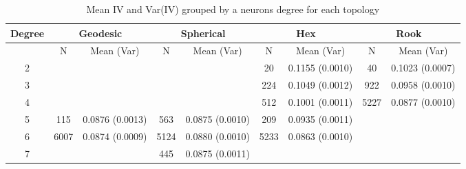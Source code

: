 \begin{table}[hbt]
\centering
\caption{Mean IV and Var(IV) grouped by a neurons degree for each topology}
\label{meanvar1}
\begin{tabular}{|c||c|c||c|c||c|c||c|c|}
\hline
\textbf{Degree} & \multicolumn{2}{c||}{\textbf{Geodesic}} &
\multicolumn{2}{c||}{\textbf{Spherical}} & \multicolumn{2}{c||}{\textbf{Hex}} &
\multicolumn{2}{c|}{\textbf{Rook}} \\
\hline
& N & Mean (Var) & N & Mean (Var) & N & Mean (Var) & N & Mean (Var) \\

\hline
2&&&&& 20& 0.1155 (0.0010)& 40& 0.1023 (0.0007)\\ 
3&&&&& 224& 0.1049 (0.0012)& 922& 0.0958 (0.0010)\\ 
4&&&&& 512& 0.1001 (0.0011)& 5227& 0.0877 (0.0010)\\ 
5& 115& 0.0876 (0.0013)& 563& 0.0875 (0.0010)& 209& 0.0935 (0.0011)&&\\ 
6& 6007& 0.0874 (0.0009)& 5124& 0.0880 (0.0010)& 5233& 0.0863 (0.0010)&&\\ 
7&&& 445& 0.0875 (0.0011)&&&&\\ 
\hline
\end{tabular} \end{table}



